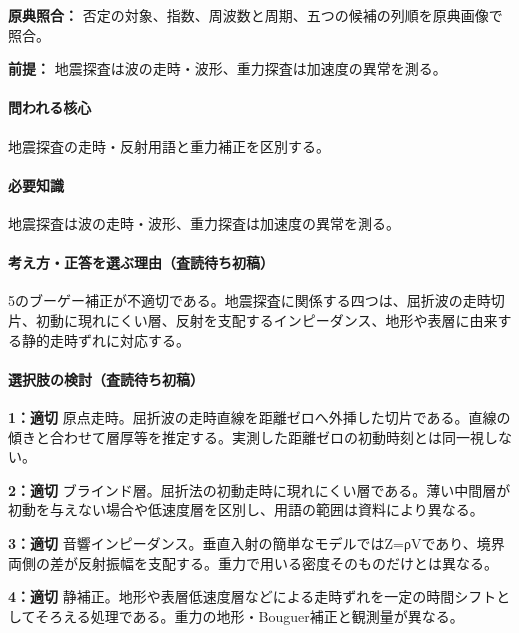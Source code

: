 \noindent\textbf{原典照合：} 否定の対象、指数、周波数と周期、五つの候補の列順を原典画像で照合。\par

\noindent\textbf{前提：} 地震探査は波の走時・波形、重力探査は加速度の異常を測る。\par

\paragraph{問われる核心} 地震探査の走時・反射用語と重力補正を区別する。

\paragraph{必要知識} 地震探査は波の走時・波形、重力探査は加速度の異常を測る。

\paragraph{考え方・正答を選ぶ理由（査読待ち初稿）} 5のブーゲー補正が不適切である。地震探査に関係する四つは、屈折波の走時切片、初動に現れにくい層、反射を支配するインピーダンス、地形や表層に由来する静的走時ずれに対応する。

\paragraph{選択肢の検討（査読待ち初稿）}\mbox{}\par

\noindent\textbf{1：適切} 原点走時。屈折波の走時直線を距離ゼロへ外挿した切片である。直線の傾きと合わせて層厚等を推定する。実測した距離ゼロの初動時刻とは同一視しない。\par

\noindent\textbf{2：適切} ブラインド層。屈折法の初動走時に現れにくい層である。薄い中間層が初動を与えない場合や低速度層を区別し、用語の範囲は資料により異なる。\par

\noindent\textbf{3：適切} 音響インピーダンス。垂直入射の簡単なモデルではZ=ρVであり、境界両側の差が反射振幅を支配する。重力で用いる密度そのものだけとは異なる。\par

\noindent\textbf{4：適切} 静補正。地形や表層低速度層などによる走時ずれを一定の時間シフトとしてそろえる処理である。重力の地形・Bouguer補正と観測量が異なる。\par

